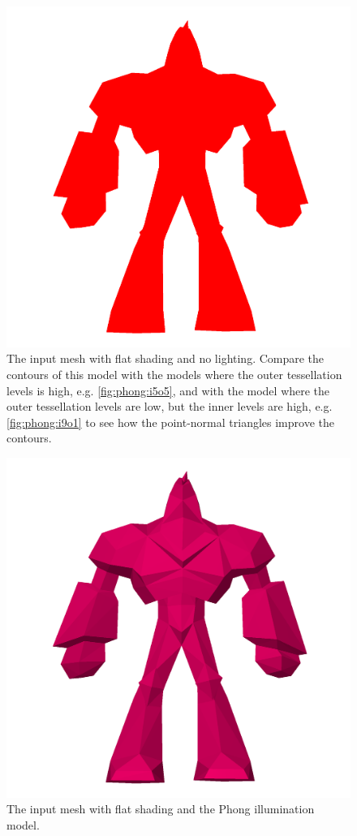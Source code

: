 \documentclass[a4paper,10pt]{article}
\begin{document}
\begin{figure}
	\includegraphics[width=\textwidth]{enforcer_flat.png}
	\caption{The input mesh with flat shading and no lighting. Compare the contours of this model with the models where the outer tessellation levels is high, e.g. \cref{fig:phong:i5o5}, and with the model where the outer tessellation levels are low, but the inner levels are high, e.g. \cref{fig:phong:i9o1} to see how the point-normal triangles improve the contours.}
	\label{fig:enforcerFlat}	
\end{figure}

\begin{figure}
	\includegraphics[width=\textwidth]{enforcer_flat_phong.png}
	\caption{The input mesh with flat shading and the Phong illumination model.}	
\end{figure}
\end{document}
